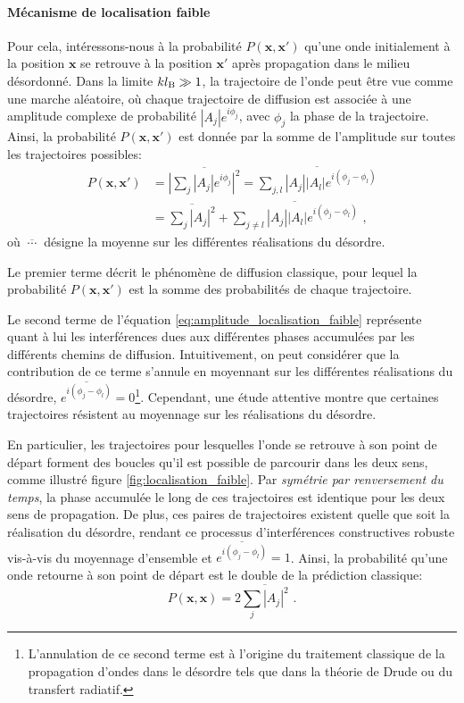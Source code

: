 \paragraph*{Mécanisme de localisation faible}
Pour cela, intéressons-nous à la probabilité $P(\mathbf{x},\mathbf{x}')$ qu'une onde initialement à la position $\mathbf{x}$ se retrouve à la position $\mathbf{x}'$ après propagation dans le milieu désordonné. Dans la limite $kl_{\mathrm{B}}\gg 1$, la trajectoire de l'onde peut être vue comme une marche aléatoire, où chaque trajectoire de diffusion est associée à une amplitude complexe de probabilité $\left| A_j \right| e^{i \phi_j}$, avec $\phi_j$ la phase de la trajectoire. Ainsi, la probabilité $P(\mathbf{x},\mathbf{x}')$ est donnée par la somme de l'amplitude sur toutes les trajectoires possibles:
\begin{align}
P(\mathbf{x},\mathbf{x}') \nonumber&= \overline{{\left| \sum_j{ \left|A_j\right| e^{i \phi_j} }\right| }^2} = \overline{\sum_{j,l} {\left| A_j \right| \left| A_l \right| e^{i (\phi_j - \phi_l)}}} \\
&= \overline{\sum_j{{\left| A_j \right|}^2}} + \overline{\sum_{j\neq l}{\left| A_j \right| \left|A_l \right| e^{i(\phi_j - \phi_l)}}} \text{ ,}
\label{eq:amplitude_localisation_faible}
\end{align}
où $\overline{\:\cdots\:}$ désigne la moyenne sur les différentes réalisations du désordre.

Le premier terme décrit le phénomène de diffusion classique, pour lequel la probabilité $P(\mathbf{x},\mathbf{x}')$ est la somme des probabilités de chaque trajectoire. 

Le second terme de l'équation \ref{eq:amplitude_localisation_faible} représente quant à lui les interférences dues aux différentes phases accumulées par les différents chemins de diffusion. Intuitivement, on peut considérer que la contribution de ce terme s'annule en moyennant sur les différentes réalisations du désordre, $\overline{e^{i(\phi_j - \phi_l)}}=0$\footnote{L'annulation de ce second terme est à l'origine du traitement classique de la propagation d'ondes dans le désordre tels que dans la théorie de Drude ou du transfert radiatif.}. Cependant, une étude attentive montre que certaines trajectoires résistent au moyennage sur les réalisations du désordre.

En particulier, les trajectoires pour lesquelles l'onde se retrouve à son point de départ forment des boucles qu'il est possible de parcourir dans les deux sens, comme illustré figure \ref{fig:localisation_faible}. Par \emph{symétrie par renversement du temps}, la phase accumulée le long de ces trajectoires est identique pour les deux sens de propagation. De plus, ces paires de trajectoires existent quelle que soit la réalisation du désordre, rendant ce processus d'interférences constructives robuste vis-à-vis du moyennage d'ensemble et $\overline{e^{i(\phi_j - \phi_l)}}=1$. Ainsi, la probabilité qu'une onde retourne à son point de départ est le double de la prédiction classique:
\begin{equation}
P(\mathbf{x},\mathbf{x})=2 \overline{\sum_j{{\left| A_j \right|}^2}} \text{ .}
\label{eq:proba_retour_origine}
\end{equation}

